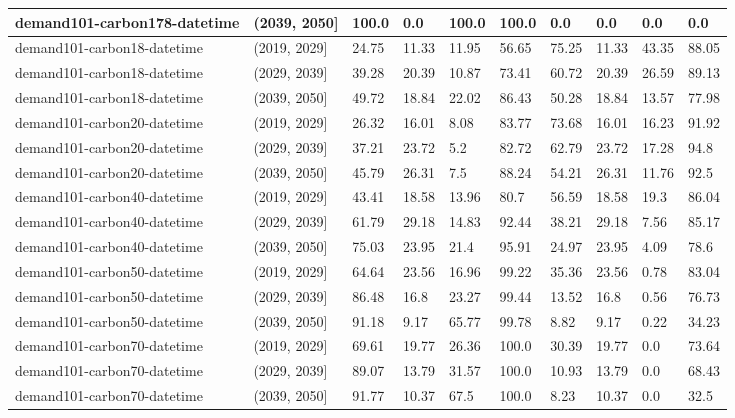 \begin{table}[h]
\begin{tabular}{|l|l|l|l|l|l|l|l|l|l|}
		demand101-carbon178-datetime & (2039, 2050] & 100.0 & 0.0 & 100.0 & 100.0 & 0.0 & 0.0 & 0.0 & 0.0 \\ \hline
		demand101-carbon18-datetime & (2019, 2029] & 24.75 & 11.33 & 11.95 & 56.65 & 75.25 & 11.33 & 43.35 & 88.05 \\ \hline
		demand101-carbon18-datetime & (2029, 2039] & 39.28 & 20.39 & 10.87 & 73.41 & 60.72 & 20.39 & 26.59 & 89.13 \\ \hline
		demand101-carbon18-datetime & (2039, 2050] & 49.72 & 18.84 & 22.02 & 86.43 & 50.28 & 18.84 & 13.57 & 77.98 \\ \hline
		demand101-carbon20-datetime & (2019, 2029] & 26.32 & 16.01 & 8.08 & 83.77 & 73.68 & 16.01 & 16.23 & 91.92 \\ \hline
		demand101-carbon20-datetime & (2029, 2039] & 37.21 & 23.72 & 5.2 & 82.72 & 62.79 & 23.72 & 17.28 & 94.8 \\ \hline
		demand101-carbon20-datetime & (2039, 2050] & 45.79 & 26.31 & 7.5 & 88.24 & 54.21 & 26.31 & 11.76 & 92.5 \\ \hline
		demand101-carbon40-datetime & (2019, 2029] & 43.41 & 18.58 & 13.96 & 80.7 & 56.59 & 18.58 & 19.3 & 86.04 \\ \hline
		demand101-carbon40-datetime & (2029, 2039] & 61.79 & 29.18 & 14.83 & 92.44 & 38.21 & 29.18 & 7.56 & 85.17 \\ \hline
		demand101-carbon40-datetime & (2039, 2050] & 75.03 & 23.95 & 21.4 & 95.91 & 24.97 & 23.95 & 4.09 & 78.6 \\ \hline
		demand101-carbon50-datetime & (2019, 2029] & 64.64 & 23.56 & 16.96 & 99.22 & 35.36 & 23.56 & 0.78 & 83.04 \\ \hline
		demand101-carbon50-datetime & (2029, 2039] & 86.48 & 16.8 & 23.27 & 99.44 & 13.52 & 16.8 & 0.56 & 76.73 \\ \hline
		demand101-carbon50-datetime & (2039, 2050] & 91.18 & 9.17 & 65.77 & 99.78 & 8.82 & 9.17 & 0.22 & 34.23 \\ \hline
		demand101-carbon70-datetime & (2019, 2029] & 69.61 & 19.77 & 26.36 & 100.0 & 30.39 & 19.77 & 0.0 & 73.64 \\ \hline
		demand101-carbon70-datetime & (2029, 2039] & 89.07 & 13.79 & 31.57 & 100.0 & 10.93 & 13.79 & 0.0 & 68.43 \\ \hline
		demand101-carbon70-datetime & (2039, 2050] & 91.77 & 10.37 & 67.5 & 100.0 & 8.23 & 10.37 & 0.0 & 32.5 \\ \hline
	\end{tabular}
\end{table}